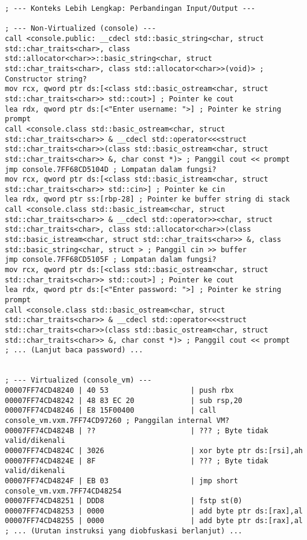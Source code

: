 \begin{verbatim}
; --- Konteks Lebih Lengkap: Perbandingan Input/Output ---

; --- Non-Virtualized (console) ---
call <console.public: __cdecl std::basic_string<char, struct std::char_traits<char>, class std::allocator<char>>::basic_string<char, struct std::char_traits<char>, class std::allocator<char>>(void)> ; Constructor string?
mov rcx, qword ptr ds:[<class std::basic_ostream<char, struct std::char_traits<char>> std::cout>] ; Pointer ke cout
lea rdx, qword ptr ds:[<"Enter username: ">] ; Pointer ke string prompt
call <console.class std::basic_ostream<char, struct std::char_traits<char>> & __cdecl std::operator<<<struct std::char_traits<char>>(class std::basic_ostream<char, struct std::char_traits<char>> &, char const *)> ; Panggil cout << prompt
jmp console.7FF68CD5104D ; Lompatan dalam fungsi?
mov rcx, qword ptr ds:[<class std::basic_istream<char, struct std::char_traits<char>> std::cin>] ; Pointer ke cin
lea rdx, qword ptr ss:[rbp-28] ; Pointer ke buffer string di stack
call <console.class std::basic_istream<char, struct std::char_traits<char>> & __cdecl std::operator>><char, struct std::char_traits<char>, class std::allocator<char>>(class std::basic_istream<char, struct std::char_traits<char>> &, class std::basic_string<char, struct > ; Panggil cin >> buffer
jmp console.7FF68CD5105F ; Lompatan dalam fungsi?
mov rcx, qword ptr ds:[<class std::basic_ostream<char, struct std::char_traits<char>> std::cout>] ; Pointer ke cout
lea rdx, qword ptr ds:[<"Enter password: ">] ; Pointer ke string prompt
call <console.class std::basic_ostream<char, struct std::char_traits<char>> & __cdecl std::operator<<<struct std::char_traits<char>>(class std::basic_ostream<char, struct std::char_traits<char>> &, char const *)> ; Panggil cout << prompt
; ... (Lanjut baca password) ...


; --- Virtualized (console_vm) ---
00007FF74CD48240 | 40 53                   | push rbx
00007FF74CD48242 | 48 83 EC 20             | sub rsp,20
00007FF74CD48246 | E8 15F00400             | call console_vm.vxm.7FF74CD97260 ; Panggilan internal VM?
00007FF74CD4824B | ??                      | ??? ; Byte tidak valid/dikenali
00007FF74CD4824C | 3026                    | xor byte ptr ds:[rsi],ah
00007FF74CD4824E | 8F                      | ??? ; Byte tidak valid/dikenali
00007FF74CD4824F | EB 03                   | jmp short console_vm.vxm.7FF74CD48254
00007FF74CD48251 | DDD8                    | fstp st(0)
00007FF74CD48253 | 0000                    | add byte ptr ds:[rax],al
00007FF74CD48255 | 0000                    | add byte ptr ds:[rax],al
; ... (Urutan instruksi yang diobfuskasi berlanjut) ...
    \end{verbatim}
\label{lst:asm_dynamic_io_comparison_full}

